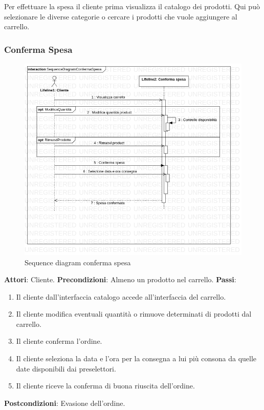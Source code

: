 \documentclass[12pt, a4paper]{report}
\begin{document}
Per effettuare la spesa il cliente prima visualizza il catalogo dei prodotti.
Qui può selezionare le diverse categorie o cercare i prodotti che vuole
aggiungere al carrello.

\newpage

\subsubsection{Conferma Spesa}

\begin{figure}[h]
  \centering
  \includegraphics[width=\textwidth]{Use Case Model!Conferma spesa!InteractionConfermaSpesa!SequenceDiagramConfermaSpesa_13.png}
  \caption{Sequence diagram conferma spesa}
\end{figure}

\break
\textbf{Attori}: Cliente.\newline
\textbf{Precondizioni}: Almeno un prodotto nel carrello. \newline
\textbf{Passi}: 
\begin{enumerate}
\item Il cliente dall'interfaccia catalogo accede all'interfaccia del carrello.
\item Il cliente modifica eventuali quantità o rimuove determinati di prodotti dal carrello.
\item Il cliente conferma l'ordine.
\item Il cliente seleziona la data e l'ora per la consegna a lui più consona da quelle date disponibili dai preselettori.
\item Il cliente riceve la conferma di buona riuscita dell'ordine.
\end{enumerate}
\textbf{Postcondizioni}: Evasione dell'ordine.
\break
\end{document}
